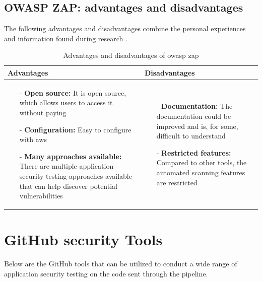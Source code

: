 \subsection{OWASP ZAP: advantages and disadvantages}
The following advantages and disadvantages combine the personal experiences and information found during research \cite{prosconsZAP}.
\begin{table}[H]
    \begin{threeparttable}
        \begin{tabular}{|>{\raggedright\arraybackslash}p{6cm}|>{\raggedright\arraybackslash}p{6cm}|}
            \hline
            \textbf{Advantages} & \textbf{Disadvantages} \\
            \hline
            \begin{itemize}
                \item [-]\textbf{Open source:} It is open source, which allows users to access it without paying 
                \vspace{5pt}
                \item [-]\textbf{Configuration:} Easy to configure with \acrshort{aws}
                \vspace{5pt}
                \item [-]\textbf{Many approaches available:} There are multiple application security testing approaches available that can help discover potential vulnerabilities
            \end{itemize}
            &
            \begin{itemize}
                \item [-] \textbf{Documentation:} The documentation could be improved and is, for some, difficult to understand
                \vspace{5pt}
                \item [-]\textbf{Restricted features:} Compared to other tools, the automated scanning features are restricted
            \end{itemize}
            \\
            \hline
        \end{tabular}
            \caption{Advantages and disadvantages of \acrshort{owasp} \acrshort{zap}}
    \end{threeparttable}
\end{table}


\section{GitHub security Tools}
Below are the GitHub tools that can be utilized to conduct a wide range of application security testing on the code sent through the pipeline. 

